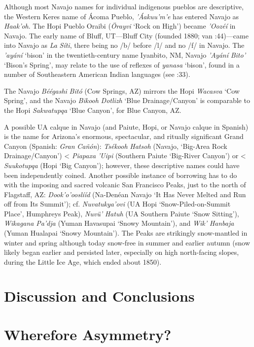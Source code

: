 Although most Navajo names for individual indigenous pueblos are descriptive, the Western Keres name of Ácoma Pueblo, \textit{’Áakuu’m’e} has entered Navajo as \textit{Haak’oh}.  The Hopi Pueblo Oraibi (\textit{Örayvi} ‘Rock on High’) became \textit{’Oozéí} in Navajo.  The early name of Bluff, UT—Bluff City (founded 1880; van \citealt{Cott1990}:44)—came into Navajo as \textit{La} \textit{Síti}, there being no /b/ before /l/ and no /f/ in Navajo.  The \textit{’ayání} ‘bison’ in the twentieth-century name  Iyanbito, NM, Navajo \textit{’Ayání} \textit{Bito’}  ‘Bison’s Spring’, may relate to the use of reflexes of \textit{yanasa} ‘bison’, found in a number of Southeastern American Indian languages (see \citealt{Haas1978}:33).

The Navajo \textit{Béégashi} \textit{Bitó} (Cow Springs, AZ) mirrors the Hopi \textit{Wacasva} ‘Cow Spring’, and the Navajo \textit{Bikooh} \textit{Dotlizh} ‘Blue Drainage/Canyon’ is comparable to the Hopi \textit{Sakwatupqa} ‘Blue Canyon’, for Blue Canyon, AZ.

A possible UA calque in Navajo (and Paiute, Hopi, or Navajo calque in Spanish) is the name for Arizona’s enormous, spectacular, and ritually significant Grand Canyon (Spanish: \textit{Gran} \textit{Cañón}):  \textit{Tsékooh} \textit{Hatsoh} (Navajo, ‘Big-Area Rock Drainage/Canyon’) < \textit{Piapaxa} \textit{’Uipi} (Southern Paiute ‘Big-River Canyon’) or < \textit{Suukotupqa} (Hopi ‘Big Canyon’); however, these descriptive names could have been independently coined.  Another possible instance of borrowing has to do with the imposing and sacred volcanic San Francisco Peaks, just to the north of Flagstaff, AZ: \textit{Dook'o'ooslííd} (Na-Denéan Navajo ‘It Has Never Melted and Run off from Its Summit’); cf. \textit{Nuvatukya'ovi} (UA Hopi ‘Snow-Piled-on-Summit Place’, Humphreys Peak), \textit{Nuvü’} \textit{Hatuh} (UA Southern Paiute ‘Snow Sitting’), \textit{Wikagana} \textit{Pa’dja} (Yuman Havasupai ‘Snowy Mountain’), and \textit{Wik’} \textit{Hanbaja} (Yuman Hualapai ‘Snowy Mountain’).  The Peaks are strikingly snow-mantled in winter and spring although today snow-free in summer and earlier autumn (snow likely began earlier and persisted later, especially on high north-facing slopes, during the Little Ice Age, which ended about 1850).

\section{\textbf{Discussion} \textbf{and} \textbf{Conclusions}}
\section{\textbf{Wherefore} \textbf{Asymmetry?}}

